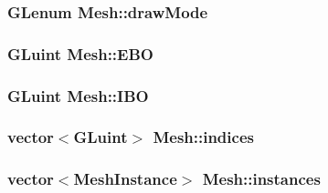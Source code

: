 \subsubsection[{\texorpdfstring{draw\+Mode}{drawMode}}]{\setlength{\rightskip}{0pt plus 5cm}G\+Lenum Mesh\+::draw\+Mode\hspace{0.3cm}{\ttfamily [protected]}}\hypertarget{class_mesh_a258588a1f2686e27238f87841ec1da8f}{}\label{class_mesh_a258588a1f2686e27238f87841ec1da8f}
\subsubsection[{\texorpdfstring{E\+BO}{EBO}}]{\setlength{\rightskip}{0pt plus 5cm}G\+Luint Mesh\+::\+E\+BO\hspace{0.3cm}{\ttfamily [protected]}}\hypertarget{class_mesh_a894c6723c0172f4e38b2509582abfa6c}{}\label{class_mesh_a894c6723c0172f4e38b2509582abfa6c}
\subsubsection[{\texorpdfstring{I\+BO}{IBO}}]{\setlength{\rightskip}{0pt plus 5cm}G\+Luint Mesh\+::\+I\+BO\hspace{0.3cm}{\ttfamily [protected]}}\hypertarget{class_mesh_ac1bab02ab0a8dacff1f1bcf9dbb446e1}{}\label{class_mesh_ac1bab02ab0a8dacff1f1bcf9dbb446e1}
\subsubsection[{\texorpdfstring{indices}{indices}}]{\setlength{\rightskip}{0pt plus 5cm}vector$<$G\+Luint$>$ Mesh\+::indices\hspace{0.3cm}{\ttfamily [protected]}}\hypertarget{class_mesh_a233e40975b5ddafda502c8c31b77db2c}{}\label{class_mesh_a233e40975b5ddafda502c8c31b77db2c}
\subsubsection[{\texorpdfstring{instances}{instances}}]{\setlength{\rightskip}{0pt plus 5cm}vector$<${\bf Mesh\+Instance}$>$ Mesh\+::instances\hspace{0.3cm}{\ttfamily [protected]}}\hypertarget{class_mesh_afa47c6543ce338b1749d5da89f17f699}{}\label{class_mesh_afa47c6543ce338b1749d5da89f17f699}
